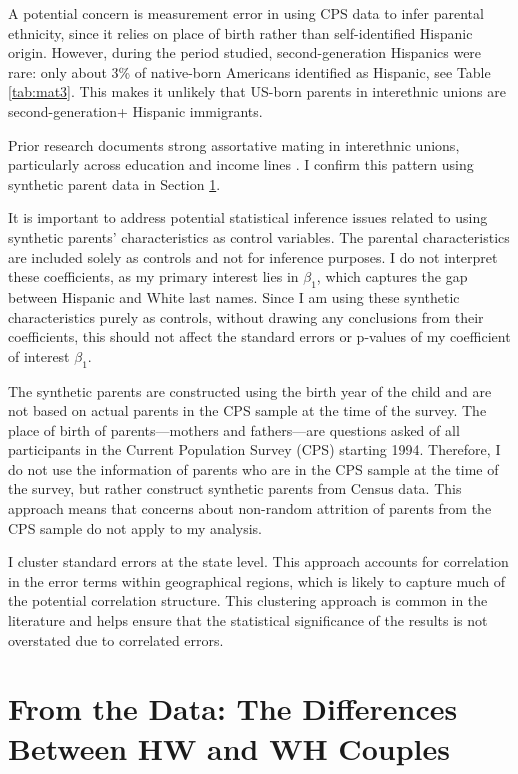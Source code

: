 A potential concern is measurement error in using CPS data to infer parental ethnicity, since it relies on place of birth rather than self-identified Hispanic origin. However, during the period studied, second-generation Hispanics were rare: only about 3\% of native-born Americans identified as Hispanic, see Table \ref{tab:mat3}. This makes it unlikely that US-born parents in interethnic unions are second-generation+ Hispanic immigrants. 

Prior research documents strong assortative mating in interethnic unions, particularly across education and income lines \autocite{beckerTheoryMarriagePart1973, chiapporiFatterAttractionAnthropometric2012, duncanIntermarriageIntergenerationalTransmission2011}. I confirm this pattern using synthetic parent data in Section \ref{sec:hw-wh-couples-data}.

It is important to address potential statistical inference issues related to using synthetic parents' characteristics as control variables. The parental characteristics are included solely as controls and not for inference purposes. I do not interpret these coefficients, as my primary interest lies in $\beta_1$, which captures the gap between Hispanic and White last names. Since I am using these synthetic characteristics purely as controls, without drawing any conclusions from their coefficients, this should not affect the standard errors or p-values of my coefficient of interest $\beta_1$.

The synthetic parents are constructed using the birth year of the child and are not based on actual parents in the CPS sample at the time of the survey. The place of birth of parents—mothers and fathers—are questions asked of all participants in the Current Population Survey (CPS) starting 1994. Therefore, I do not use the information of parents who are in the CPS sample at the time of the survey, but rather construct synthetic parents from Census data. This approach means that concerns about non-random attrition of parents from the CPS sample do not apply to my analysis.

I cluster standard errors at the state level. This approach accounts for correlation in the error terms within geographical regions, which is likely to capture much of the potential correlation structure. This clustering approach is common in the literature and helps ensure that the statistical significance of the results is not overstated due to correlated errors.

\section{From the Data: The Differences Between HW and WH Couples}\label{sec:hw-wh-couples-data}

